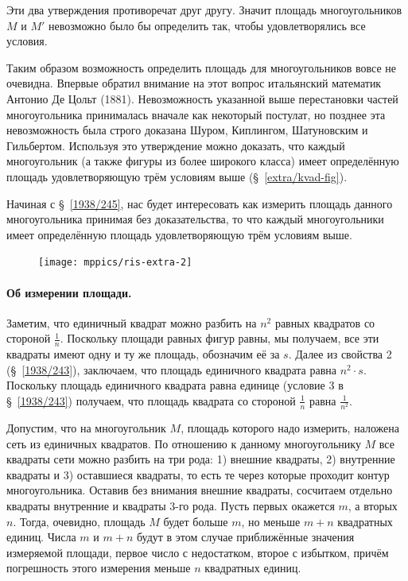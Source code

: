 \documentclass[oneside]{book}
\begin{document}
Эти два утверждения противоречат друг другу.
Значит площадь многоугольников $M$ и $M'$ невозможно было бы определить так, чтобы удовлетворялись все условия.

{\sloppy
Таким образом возможность определить площадь для многоугольников вовсе не очевидна.
Впервые обратил внимание на этот вопрос итальянский математик Антонио Де Цольт (1881).
Невозможность указанной выше перестановки частей многоугольника принималась вначале как некоторый постулат, но позднее эта невозможность была строго доказана Шуром, Киплингом, Шатуновским и Гильбертом.
Используя  это утверждение можно доказать, что каждый многоугольник (а также фигуры из более широкого класса) имеет определённую площадь удовлетворяющую трём условиям выше (§~\ref{extra/kvad-fig}).

}


Начиная с §~\ref{1938/245}, нас будет интересовать как измерить площадь данного многоугольника принимая без доказательства, то что каждый многоугольники имеет определённую площадь удовлетворяющую трём условиям выше.

\begin{figure}
\centering
\texttt{[image: mppics/ris-extra-2]}
\caption{}\label{extra/ris-2}
\end{figure}

\paragraph{Об измерении площади.}\label{1938/244}
Заметим, что единичный квадрат можно разбить на $n^2$ равных квадратов со стороной $\tfrac1n$. 
Поскольку площади равных фигур равны, мы получаем, все эти квадраты имеют одну и ту же площадь, обозначим её за $s$.
Далее из свойства 2 (§~\ref{1938/243}), заключаем, что площадь единичного квадрата равна $n^2\cdot s$.
Поскольку площадь единичного квадрата равна единице (условие 3 в §~\ref{1938/243}) получаем, что площадь квадрата со стороной $\tfrac1n$ равна $\tfrac1{n^2}$.

Допустим, что на многоугольник $M$, площадь которого надо измерить, наложена сеть из единичных квадратов.
По отношению к данному многоугольнику $M$ все квадраты сети можно разбить на
три рода: 
1) внешние квадраты, 
2) внутренние квадраты и 
3) оставшиеся квадраты, то есть те через которые проходит контур многоугольника.
Оставив без внимания внешние квадраты, сосчитаем отдельно квадраты внутренние и квадраты 3-го рода.
Пусть первых окажется $m$, а вторых $n$.
Тогда, очевидно, площадь $M$ будет больше $m$, но меньше $m+n$ квадратных единиц.
Числа $m$ и $m+n$ будут в этом случае приближённые значения измеряемой площади, первое число с недостатком, второе с избытком, причём погрешность этого измерения меньше $n$ квадратных единиц.
\end{document}
